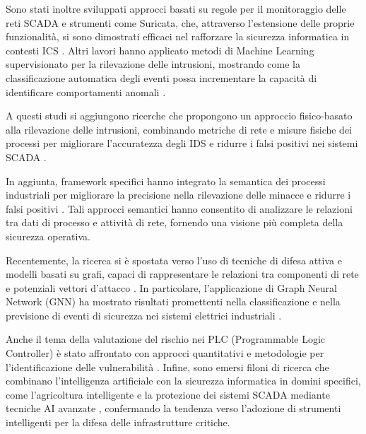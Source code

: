 Sono stati inoltre sviluppati approcci basati su regole per il monitoraggio delle reti SCADA \cite{ruleBasedScadaNetwork} e strumenti come Suricata, che, attraverso l’estensione delle proprie funzionalità, si sono dimostrati efficaci nel rafforzare la sicurezza informatica in contesti ICS \cite{suricataEnhancingIdsCyberSecurity}. Altri lavori hanno applicato metodi di Machine Learning supervisionato per la rilevazione delle intrusioni, mostrando come la classificazione automatica degli eventi possa incrementare la capacità di identificare comportamenti anomali \cite{supervisedLearningIdsScada}.

A questi studi si aggiungono ricerche che propongono un approccio fisico-basato alla rilevazione delle intrusioni, combinando metriche di rete e misure fisiche dei processi per migliorare l’accuratezza degli IDS e ridurre i falsi positivi nei sistemi SCADA \cite{alasiri202034}.

In aggiunta, framework specifici hanno integrato la semantica dei processi industriali per migliorare la precisione nella rilevazione delle minacce e ridurre i falsi positivi \cite{idsScadaFrameworkIncorporateProcessSemantics, semanticSecurityAnalysisScadaNetwork}. Tali approcci semantici hanno consentito di analizzare le relazioni tra dati di processo e attività di rete, fornendo una visione più completa della sicurezza operativa.

Recentemente, la ricerca si è spostata verso l’uso di tecniche di difesa attiva e modelli basati su grafi, capaci di rappresentare le relazioni tra componenti di rete e potenziali vettori d’attacco \cite{graphBasedActiveCyberDefense}. In particolare, l’applicazione di Graph Neural Network (GNN) ha mostrato risultati promettenti nella classificazione e nella previsione di eventi di sicurezza nei sistemi elettrici industriali \cite{graphNeuralNetworkIdsElectrical}.

Anche il tema della valutazione del rischio nei PLC (Programmable Logic Controller) è stato affrontato con approcci quantitativi e metodologie per l’identificazione delle vulnerabilità \cite{plcCybersecuirtyRisk}. Infine, sono emersi filoni di ricerca che combinano l’intelligenza artificiale con la sicurezza informatica in domini specifici, come l’agricoltura intelligente \cite{cyberSecurityAgricoltureMachineLearning} e la protezione dei sistemi SCADA mediante tecniche AI avanzate \cite{aiScada}, confermando la tendenza verso l’adozione di strumenti intelligenti per la difesa delle infrastrutture critiche.